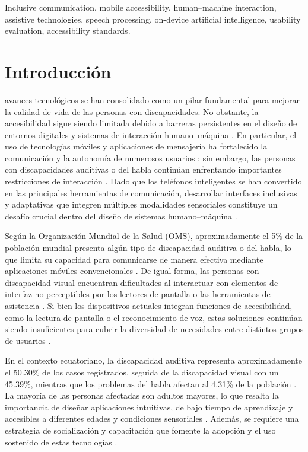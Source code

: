 \documentclass[lettersize,journal]{IEEEtran}
\begin{document}
    \begin{IEEEkeywords}
        Inclusive communication, mobile accessibility, human–machine interaction, assistive technologies, speech processing, on-device artificial intelligence, usability evaluation, accessibility standards.
    \end{IEEEkeywords}

    \section{Introducción}
         avances tecnológicos se han consolidado como un pilar fundamental para mejorar la calidad de vida de las personas con discapacidades. No obstante, la accesibilidad sigue siendo limitada debido a barreras persistentes en el diseño de entornos digitales y sistemas de interacción humano–máquina \cite{Manirajee2024}. En particular, el uso de tecnologías móviles y aplicaciones de mensajería ha fortalecido la comunicación y la autonomía de numerosos usuarios \cite{Shezi2020}; sin embargo, las personas con discapacidades auditivas o del habla continúan enfrentando importantes restricciones de interacción \cite{Seebun2020}. Dado que los teléfonos inteligentes se han convertido en las principales herramientas de comunicación, desarrollar interfaces inclusivas y adaptativas que integren múltiples modalidades sensoriales constituye un desafío crucial dentro del diseño de sistemas humano–máquina \cite{Kaur2020}.
        
        Según la Organización Mundial de la Salud (OMS), aproximadamente el 5\% de la población mundial presenta algún tipo de discapacidad auditiva o del habla, lo que limita su capacidad para comunicarse de manera efectiva mediante aplicaciones móviles convencionales \cite{Chhajed2021}. De igual forma, las personas con discapacidad visual encuentran dificultades al interactuar con elementos de interfaz no perceptibles por los lectores de pantalla o las herramientas de asistencia \cite{Khan2020}. Si bien los dispositivos actuales integran funciones de accesibilidad, como la lectura de pantalla o el reconocimiento de voz, estas soluciones continúan siendo insuficientes para cubrir la diversidad de necesidades entre distintos grupos de usuarios \cite{Kaur2020}.
        
        En el contexto ecuatoriano, la discapacidad auditiva representa aproximadamente el 50.30\% de los casos registrados, seguida de la discapacidad visual con un 45.39\%, mientras que los problemas del habla afectan al 4.31\% de la población \cite{CONADIS2024}. La mayoría de las personas afectadas son adultos mayores, lo que resalta la importancia de diseñar aplicaciones intuitivas, de bajo tiempo de aprendizaje y accesibles a diferentes edades y condiciones sensoriales \cite{Zaid2023}. Además, se requiere una estrategia de socialización y capacitación que fomente la adopción y el uso sostenido de estas tecnologías \cite{Yeratziotis2022}.
        
\end{document}
